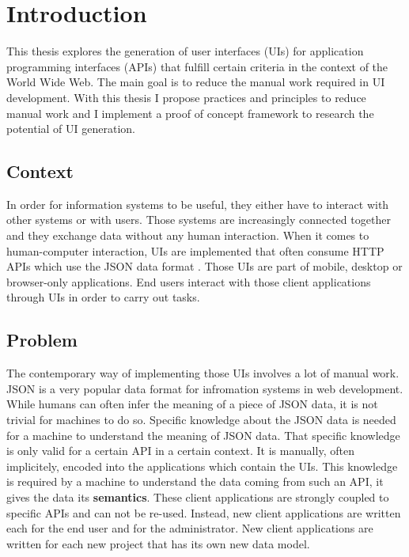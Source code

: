 \section{Introduction}\label{introduction}

This thesis explores the generation of user interfaces (UIs) for application programming interfaces (APIs) that fulfill certain criteria in the context of the World Wide Web. The main goal is to reduce the manual work required in UI development. With this thesis I propose practices and principles to reduce manual work and I implement a proof of concept framework to research the potential of UI generation.

\subsection{Context}\label{context}
In order for information systems to be useful, they either have to interact with other systems or with users. Those systems are increasingly connected together and they exchange data without any human interaction. When it comes to human-computer interaction, UIs are implemented that often consume HTTP APIs which use the JSON data format \citep{jsonformat}. Those UIs are part of mobile, desktop or browser-only applications. End users interact with those client applications through UIs in order to carry out tasks.

\subsection{Problem}\label{problem}
The contemporary way of implementing those UIs involves a lot of manual work. JSON is a very popular data format for infromation systems in web development. While humans can often infer the meaning of a piece of JSON data, it is not trivial for machines to do so. Specific knowledge about the JSON data is needed for a machine to understand the meaning of JSON data. That specific knowledge is only valid for a certain API in a certain context. It is manually, often implicitely, encoded into the applications which contain the UIs. This knowledge is required by a machine to understand the data coming from such an API, it gives the data its \textbf{semantics}. These client applications are strongly coupled to specific APIs and can not be re-used. Instead, new client applications are written each for the end user and for the administrator. New client applications are written for each new project that has its own new data model.

